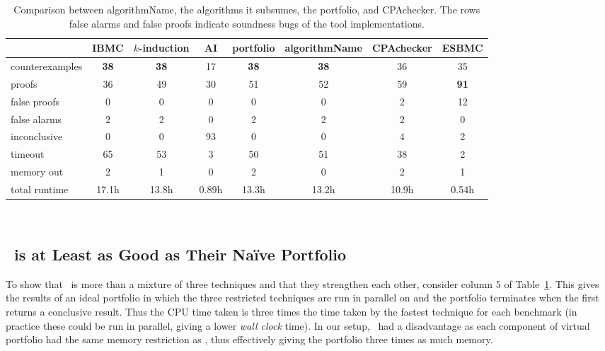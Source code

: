 {\begin{table}
\centering
\begin{tabular}{|l|ccc|c|c|c|c|}
\hline
& IBMC & $k$-induction & AI & portfolio & algorithmName &
                                                               CPAchecker & ESBMC \\
\hline
counterexamples & \bf 38 & \bf 38 &  17 & \bf 38 & \bf 38 & 36 &  35 \\
proofs          &    36 &  49 &  30 &  51 &  52 & 59 & \bf 91 \\
false proofs    &     0 &   0 &   0 &   0 &   0 &  2 &  12\\
false alarms    &     2 &   2 &   0 &   2 &   2 &  2 &   0\\
inconclusive    &     0 &   0 &  93 &   0 &   0 &  4 &   2\\
timeout         &    65 &  53 &   3 &  50 &  51 & 38 &   2 \\
memory out      &     2 &   1 &   0 &   2 &   0 &  2 &   1 \\
total runtime   & 17.1h & 13.8h & 0.89h & 13.3h & 13.2h & 10.9h & 0.54h \\
\hline
\end{tabular}~\\[1ex]
\caption{Comparison between algorithmName, the algorithms it subsumes,
the portfolio, and CPAchecker. The rows false alarms and false proofs 
indicate soundness bugs of the tool implementations.
\label{tab:results}}
\end{table}

\subsection{\algorithmName\ is at Least as Good as Their Na\"ive Portfolio}

To show
that \algorithmName\ is more than a mixture of three techniques and
that they strengthen each other, consider column 5 of
Table~\ref{tab:results}.  This gives the results of an ideal portfolio
in which the three restricted techniques are run in parallel on and
the portfolio terminates when the first returns a conclusive result.
Thus the CPU time taken is three times the time taken by the fastest
technique for each benchmark (in practice these could be run in
parallel, giving a lower \emph{wall clock} time).
%
In our setup, \algorithmName\ had a disadvantage as each component of
virtual portfolio had the same %
memory restriction as
{\algorithmName}, thus effectively giving the portfolio three times as much memory.

}
